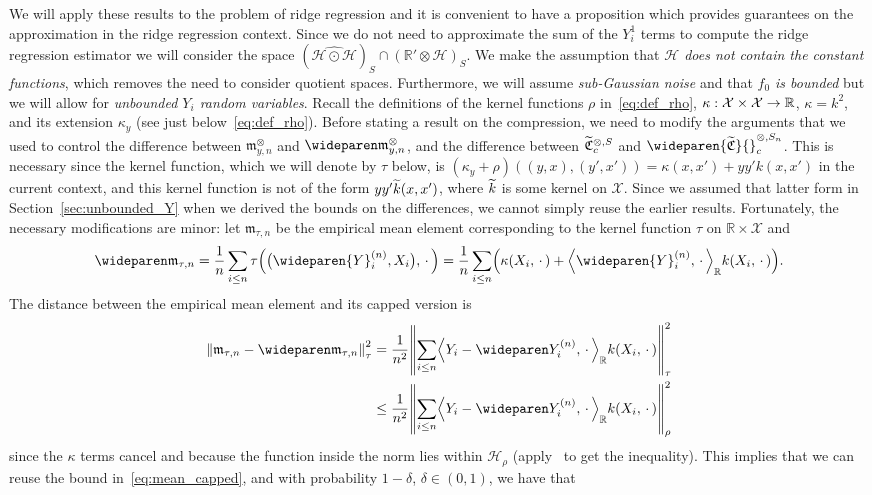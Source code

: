 \documentclass[AHL,Unicode,longabstracts,published]{cedram}
\theoremstyle{remark}
\newcommand{\R}{\mathbb{R}}
\newcommand{\dR}{{\R'}}
\newcommand{\X}{\mathcal{X}}
\newcommand{\cH}{\mathcal{H}}
\newcommand{\fkC}{\mathfrak{C}}
\newcommand{\mean}{\mathfrak{m}}
\newcommand{\CovCapn}{\wideparen{\widetilde{\fkC}}{\vphantom{\fkC}}^{\otimes,S_n}_c}
\let\oldtilde\tilde
\renewcommand*{\tilde}[1]{\mathchoice{\widetilde{#1}}{\widetilde{#1}}{\oldtilde{#1}}{\oldtilde{#1}}}
\renewcommand*{\to}{\mathchoice{\longrightarrow}{\rightarrow}{\rightarrow}{\rightarrow}}
\let\originalleft\left
\let\originalright\right
\renewcommand{\left}{\mathopen{}\mathclose\bgroup\originalleft}
\renewcommand{\right}{\aftergroup\egroup\originalright}
\begin{document}
We will apply these results to the problem of ridge regression and it is convenient to have a proposition which provides guarantees on the approximation in the ridge regression context. Since we do not need to approximate the sum of the $Y_i^1$ terms to compute the ridge regression estimator we will consider the space $(\widehat{\cH \odot \cH})_S \cap (\dR \otimes \cH)_S$. We make the assumption that \emph{$\cH$ does not contain the constant functions}, which removes the need to consider quotient spaces. Furthermore, we will assume \emph{sub-Gaussian noise} and that \emph{$f_0$ is bounded} but we will allow for \emph{unbounded $Y_i$ random variables}. Recall the definitions of the kernel functions $\rho$ in~\eqref{eq:def_rho}, $\kappa:\X \times \X \to \R$, $\kappa = k^2$, and its extension $\kappa_y$ (see just below~\eqref{eq:def_rho}). Before stating a result on the compression, we need to modify the arguments that we used to control the difference between $\mean_{y,n}^\otimes$ and $\wideparen \mean_{y,n}^\otimes$, and the difference between $\tilde{\fkC}^{\otimes,S}_c$ and $\CovCapn$. This is necessary since the kernel function, which we will denote by $\tau$ below, is $(\kappa_y + \rho)((y,x), (y',x')) = \kappa(x,x') + yy' k(x,x')$ in the current context, and this kernel function is not of the form $yy' \tilde k(x,x')$, where $\tilde k$ is some kernel on $\X$. Since we assumed that latter form in Section~\ref{sec:unbounded_Y} when we derived the bounds on the differences, we cannot simply reuse the earlier results. Fortunately, the necessary modifications are minor: let $\mean_{\tau,n}$ be the empirical mean element corresponding to the kernel function $\tau$ on $\R \times \X$ and
\[
\wideparen \mean_{\tau,n} = \frac{1}{n} \sum_{i\leq n} \tau\left(\bigl(\wideparen{Y}_i^{(n)}, X_i\bigr), \,\cdot\,\right) = \frac{1}{n} \sum_{i\leq n} \left(\kappa(X_i,\,\cdot\,) + \left\langle \wideparen{Y}_i^{(n)},\,\cdot\, \right\rangle_\R k(X_i,\,\cdot\,)\right).
\]
The distance between the empirical mean element and its capped version is
\begin{align*}
\left\| \mean_{\tau,n} - \wideparen \mean_{\tau,n} \right\|^2_\tau &= \frac{1}{n^2} \left\| \sum_{i\leq n} \left\langle Y_i - \wideparen Y_i^{(n)},\,\cdot\, \right\rangle_\R k(X_i,\,\cdot\,) \right\|^2_\tau \\
&\leq\frac{1}{n^2} \left\| \sum_{i\leq n} \left\langle Y_i - \wideparen Y_i^{(n)},\,\cdot\, \right\rangle_\R k(X_i,\,\cdot\,) \right\|^2_\rho
\end{align*}
since the $\kappa$ terms cancel and because the function inside the norm lies within $\cH_\rho$ (apply~\cite[Theorem~5.4]{PAUL16} to get the inequality). This implies that we can reuse the bound in~\eqref{eq:mean_capped}, and with probability $1-\delta$, $\delta \in (0,1)$, we have that
\end{document}
